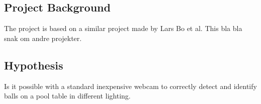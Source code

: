 \subsection{Project Background}
The project is based on a similar project made by Lars Bo et al. This bla bla
snak om andre projekter.


\subsection{Hypothesis}
Is it possible with a standard inexpensive webcam to correctly detect and identify balls on a pool table in different lighting.